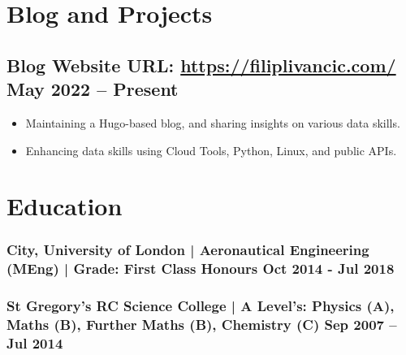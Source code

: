 \documentclass[a4paper, 9pt]{article}
\begin{document}
\section*{Blog and Projects}
\vspace{-2.5mm}

\subsection*{\textbf{Blog Website URL}: \url{https://filiplivancic.com/} \hfill  May 2022 – Present}
\begin{itemize}[noitemsep]
	\item Maintaining a Hugo-based blog, and sharing insights on various data skills.
    \item Enhancing data skills using Cloud Tools, Python, Linux, and public APIs.
\end{itemize}

\section*{Education}
\vspace{-2.5mm}
\subsubsection*{\textbf {City, University of London | Aeronautical Engineering (MEng)} | Grade: First Class Honours   \hfill \textbf{Oct 2014 - Jul 2018}}\FloatBarrier

\vspace{-1mm}

\subsubsection*{\textbf{St Gregory’s RC Science College} | A Level's: Physics (A), Maths (B), Further Maths (B), Chemistry (C)  \hfill  \textbf{Sep 2007 – Jul 2014}}

\vspace{3.5mm}
{\titlerule[1.0pt]}

\date{}
\end{document}
